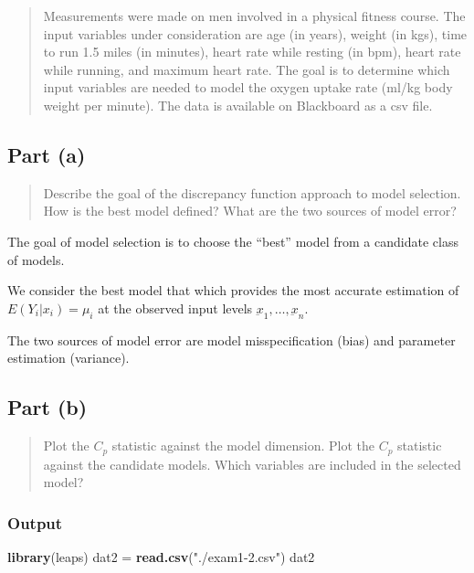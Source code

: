 \documentclass[
]{article}
\newenvironment{Shaded}{\begin{snugshade}}{\end{snugshade}}
\newcommand{\FunctionTok}[1]{\textcolor[rgb]{0.13,0.29,0.53}{\textbf{#1}}}
\newcommand{\NormalTok}[1]{#1}
\newcommand{\OtherTok}[1]{\textcolor[rgb]{0.56,0.35,0.01}{#1}}
\newcommand{\StringTok}[1]{\textcolor[rgb]{0.31,0.60,0.02}{#1}}
\begin{document}
\begin{quote}
Measurements were made on men involved in a physical fitness course. The
input variables under consideration are age (in years), weight (in kgs),
time to run 1.5 miles (in minutes), heart rate while resting (in bpm),
heart rate while running, and maximum heart rate. The goal is to
determine which input variables are needed to model the oxygen uptake
rate (ml/kg body weight per minute). The data is available on Blackboard
as a csv file.
\end{quote}

\hypertarget{part-a-1}{%
\subsection{Part (a)}\label{part-a-1}}

\begin{quote}
Describe the goal of the discrepancy function approach to model
selection. How is the best model defined? What are the two sources of
model error?
\end{quote}

The goal of model selection is to choose the ``best'' model from a
candidate class of models.

We consider the best model that which provides the most accurate
estimation of \(E(Y_i|x_i) = \mu_i\) at the observed input levels
\(\underbar{x}_1,\ldots,\underbar{x}_n\).

The two sources of model error are model misspecification (bias) and
parameter estimation (variance).

\hypertarget{part-b-1}{%
\subsection{Part (b)}\label{part-b-1}}

\begin{quote}
Plot the \(C_p\) statistic against the model dimension. Plot the \(C_p\)
statistic against the candidate models. Which variables are included in
the selected model?
\end{quote}

\hypertarget{output-8}{%
\subsubsection{Output}\label{output-8}}

\begin{Shaded}
\begin{Highlighting}[]
\FunctionTok{library}\NormalTok{(leaps)}
\NormalTok{dat2 }\OtherTok{=} \FunctionTok{read.csv}\NormalTok{(}\StringTok{"./exam1{-}2.csv"}\NormalTok{)}
\NormalTok{dat2}
\end{Highlighting}
\end{Shaded}
\end{document}
